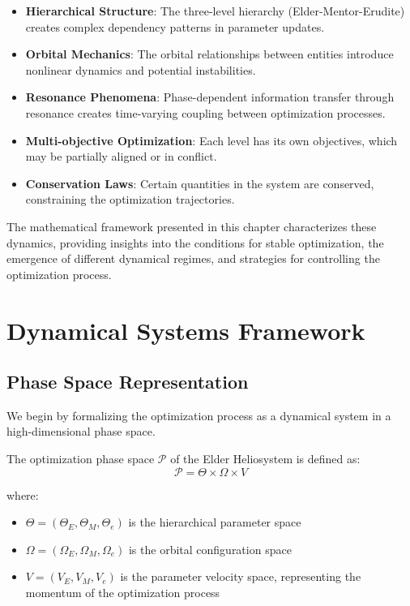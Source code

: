 \begin{itemize}
    \item \textbf{Hierarchical Structure}: The three-level hierarchy (Elder-Mentor-Erudite) creates complex dependency patterns in parameter updates.
    \item \textbf{Orbital Mechanics}: The orbital relationships between entities introduce nonlinear dynamics and potential instabilities.
    \item \textbf{Resonance Phenomena}: Phase-dependent information transfer through resonance creates time-varying coupling between optimization processes.
    \item \textbf{Multi-objective Optimization}: Each level has its own objectives, which may be partially aligned or in conflict.
    \item \textbf{Conservation Laws}: Certain quantities in the system are conserved, constraining the optimization trajectories.
\end{itemize}

The mathematical framework presented in this chapter characterizes these dynamics, providing insights into the conditions for stable optimization, the emergence of different dynamical regimes, and strategies for controlling the optimization process.

\section{Dynamical Systems Framework}

\subsection{Phase Space Representation}

We begin by formalizing the optimization process as a dynamical system in a high-dimensional phase space.

\begin{definition}
The optimization phase space $\mathcal{P}$ of the Elder Heliosystem is defined as:
\begin{equation}
\mathcal{P} = \Theta \times \Omega \times V
\end{equation}

where:
\begin{itemize}
    \item $\Theta = (\Theta_E, \Theta_M, \Theta_e)$ is the hierarchical parameter space
    \item $\Omega = (\Omega_E, \Omega_M, \Omega_e)$ is the orbital configuration space
    \item $V = (V_E, V_M, V_e)$ is the parameter velocity space, representing the momentum of the optimization process
\end{itemize}
\end{definition}

